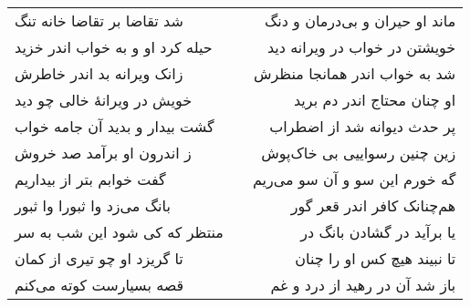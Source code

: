 \begin{center}
\begin{longtable}{l p{0.5cm} r}
\\
شد تقاضا بر تقاضا خانه تنگ
&&
ماند او حیران و بی‌درمان و دنگ
\\
حیله کرد او و به خواب اندر خزید
&&
خویشتن در خواب در ویرانه دید
\\
زانک ویرانه بد اندر خاطرش
&&
شد به خواب اندر همانجا منظرش
\\
خویش در ویرانهٔ خالی چو دید
&&
او چنان محتاج اندر دم برید
\\
گشت بیدار و بدید آن جامه خواب
&&
پر حدث دیوانه شد از اضطراب
\\
ز اندرون او برآمد صد خروش
&&
زین چنین رسواییی بی خاک‌پوش
\\
گفت خوابم بتر از بیداریم
&&
گه خورم این سو و آن سو می‌ریم
\\
بانگ می‌زد وا ثبورا وا ثبور
&&
هم‌چنانک کافر اندر قعر گور
\\
منتظر که کی شود این شب به سر
&&
یا برآید در گشادن بانگ در
\\
تا گریزد او چو تیری از کمان
&&
تا نبیند هیچ کس او را چنان
\\
قصه بسیارست کوته می‌کنم
&&
باز شد آن در رهید از درد و غم
\\
\end{longtable}
\end{center}
